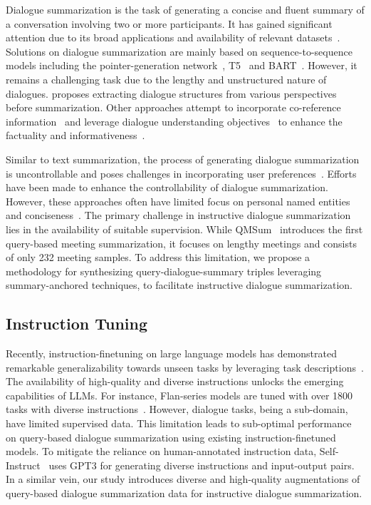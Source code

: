 \documentclass[11pt]{article}
\begin{document}
        Dialogue summarization is the task of generating a concise and fluent summary of a conversation involving two or more participants. It has gained significant attention due to its broad applications and availability of relevant datasets~\cite{gliwa-etal-2019-samsum,chen-etal-2021-dialogsum,zhao2021todsum}. Solutions on dialogue summarization are mainly based on sequence-to-sequence models including the pointer-generation network~\cite{see-etal-2017-get}, T5~\cite{raffel2020exploring} and BART~\cite{lewis-etal-2020-bart}. However, it remains a challenging task due to the lengthy and unstructured nature of dialogues. \citet{chen-yang-2020-multi} proposes extracting dialogue structures from various perspectives before summarization. Other approaches attempt to incorporate co-reference information~\cite{liu-etal-2021-coreference} and leverage dialogue understanding objectives~\cite{liu-etal-2021-topic-aware} to enhance the factuality and informativeness~\cite{tang-etal-2022-confit,wang-etal-2022-analyzing}.

        
        Similar to text summarization, the process of generating dialogue summarization is uncontrollable and poses challenges in incorporating user preferences~\cite{zhong-etal-2021-qmsum,he-etal-2022-ctrlsum}. Efforts have been made to enhance the controllability of dialogue summarization. However, these approaches often have limited focus on personal named entities~\cite{liu-chen-2021-controllable,liu-chen-2022-entity,wang2022focused} and conciseness~\cite{wang2022focused}. The primary challenge in instructive dialogue summarization lies in the availability of suitable supervision. While QMSum~\cite{zhong-etal-2021-qmsum} introduces the first query-based meeting summarization, it focuses on lengthy meetings and consists of only 232 meeting samples. To address this limitation, we propose a methodology for synthesizing query-dialogue-summary triples leveraging summary-anchored techniques, to facilitate instructive dialogue summarization.

    \subsection{Instruction Tuning}

        Recently, instruction-finetuning on large language models has demonstrated remarkable generalizability towards unseen tasks by leveraging task descriptions~\cite{brown2020language,wang-etal-2022-super,chung2022scaling}. The availability of high-quality and diverse instructions unlocks the emerging capabilities of LLMs. For instance, Flan-series models are tuned with over 1800 tasks with diverse instructions~\cite{chung2022scaling}. However, dialogue tasks, being a sub-domain, have limited supervised data. This limitation leads to sub-optimal performance on query-based dialogue summarization using existing instruction-finetuned models. To mitigate the reliance on human-annotated instruction data, Self-Instruct~\cite{selfinstruct} uses GPT3 for generating diverse instructions and input-output pairs. In a similar vein, our study introduces diverse and high-quality augmentations of query-based dialogue summarization data for instructive dialogue summarization.
        
\end{document}
